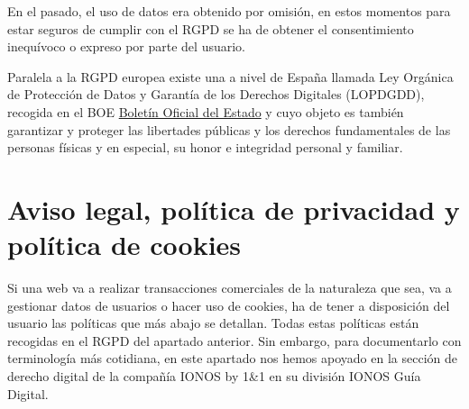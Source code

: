 \documentclass[
  a4paper,
  openany]{book}
\begin{document}
En el pasado, el uso de datos era obtenido por omisión, en estos momentos para estar seguros de cumplir con el RGPD se ha de obtener el consentimiento inequívoco o expreso por parte del usuario.

Paralela a la RGPD europea existe una a nivel de España llamada Ley Orgánica de Protección de Datos y Garantía de los Derechos Digitales (LOPDGDD), recogida en el BOE \href{https://www.boe.es/buscar/doc.php?id=BOE-A-2018-16673}{Boletín Oficial del Estado} y cuyo objeto es también garantizar y proteger las libertades públicas y los derechos fundamentales de las personas físicas y en especial, su honor e integridad personal y familiar.

\hypertarget{aviso-legal-poluxedtica-de-privacidad-y-poluxedtica-de-cookies}{%
\section{Aviso legal, política de privacidad y política de cookies}\label{aviso-legal-poluxedtica-de-privacidad-y-poluxedtica-de-cookies}}

Si una web va a realizar transacciones comerciales de la naturaleza que sea, va a gestionar datos de usuarios o hacer uso de cookies, ha de tener a disposición del usuario las políticas que más abajo se detallan. Todas estas políticas están recogidas en el RGPD del apartado anterior. Sin embargo, para documentarlo con terminología más cotidiana, en este apartado nos hemos apoyado en la sección de derecho digital de la compañía IONOS by 1\&1 en su división IONOS Guía Digital.
\end{document}

